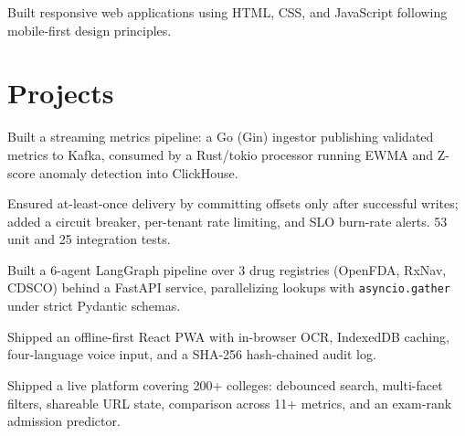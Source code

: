 \documentclass[a4paper,10pt]{article}
\begin{document}
\begin{points}
  \item Built responsive web applications using HTML, CSS, and JavaScript following mobile-first design principles.
\end{points}

\section{Projects}

\begin{points}
  \item Built a streaming metrics pipeline: a Go (Gin) ingestor publishing validated metrics to Kafka, consumed by a Rust/tokio processor running EWMA and Z-score anomaly detection into ClickHouse.
  \item Ensured at-least-once delivery by committing offsets only after successful writes; added a circuit breaker, per-tenant rate limiting, and SLO burn-rate alerts. 53 unit and 25 integration tests.
\end{points}
\gap

\begin{points}
  \item Built a 6-agent LangGraph pipeline over 3 drug registries (OpenFDA, RxNav, CDSCO) behind a FastAPI service, parallelizing lookups with \texttt{asyncio.gather} under strict Pydantic schemas.
  \item Shipped an offline-first React PWA with in-browser OCR, IndexedDB caching, four-language voice input, and a SHA-256 hash-chained audit log.
\end{points}
\gap

\begin{points}
  \item Shipped a live platform covering 200+ colleges: debounced search, multi-facet filters, shareable URL state, comparison across 11+ metrics, and an exam-rank admission predictor.
\end{points}
\gap
\end{document}
